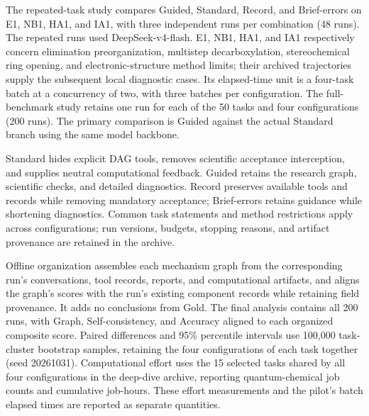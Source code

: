 The repeated-task study compares Guided, Standard, Record, and Brief-errors on E1, NB1, HA1, and IA1, with three independent runs per combination (48 runs). The repeated runs used DeepSeek-v4-flash. E1, NB1, HA1, and IA1 respectively concern elimination preorganization, multistep decarboxylation, stereochemical ring opening, and electronic-structure method limits; their archived trajectories supply the subsequent local diagnostic cases. Its elapsed-time unit is a four-task batch at a concurrency of two, with three batches per configuration. The full-benchmark study retains one run for each of the 50 tasks and four configurations (200 runs). The primary comparison is Guided against the actual Standard branch using the same model backbone.

\newpage

Standard hides explicit DAG tools, removes scientific acceptance interception, and supplies neutral computational feedback. Guided retains the research graph, scientific checks, and detailed diagnostics. Record preserves available tools and records while removing mandatory acceptance; Brief-errors retains guidance while shortening diagnostics. Common task statements and method restrictions apply across configurations; run versions, budgets, stopping reasons, and artifact provenance are retained in the archive.



Offline organization assembles each mechanism graph from the corresponding run's conversations, tool records, reports, and computational artifacts, and aligns the graph's scores with the run's existing component records while retaining field provenance. It adds no conclusions from Gold. The final analysis contains all 200 runs, with Graph, Self-consistency, and Accuracy aligned to each organized composite score. Paired differences and 95\% percentile intervals use 100,000 task-cluster bootstrap samples, retaining the four configurations of each task together (seed 20261031). Computational effort uses the 15 selected tasks shared by all four configurations in the deep-dive archive, reporting quantum-chemical job counts and cumulative job-hours. These effort measurements and the pilot's batch elapsed times are reported as separate quantities.

